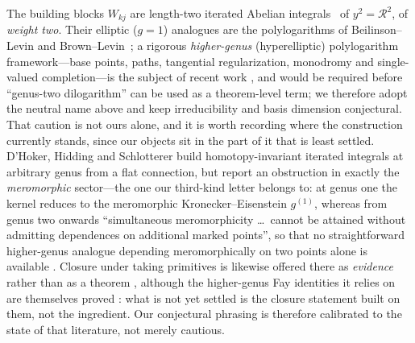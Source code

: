 \documentclass[12pt]{iopart}
\theoremstyle{plain}
\theoremstyle{definition}
\theoremstyle{remark}
\begin{document}
The building blocks $W_{kj}$ are length-two iterated Abelian
integrals~\cite{Chen1977} of $y^2=\mathcal{R}^2$, of \emph{weight two}. Their elliptic
($g{=}1$) analogues are the polylogarithms of Beilinson--Levin and
Brown--Levin~\cite{BeilinsonLevin1994,BrownLevin2011}; a rigorous \emph{higher-genus}
(hyperelliptic) polylogarithm framework---base points, paths, tangential
regularization, monodromy and single-valued completion---is the subject of recent work
\cite{BauneEtal2024,DHokerSchlotterer2024,DHokerHiddingSchlotterer2025,DHokerEnriquezSchlottererZerbini2026},
and would be required before ``genus-two
dilogarithm'' can be used as a theorem-level term; we therefore adopt the neutral name
above and keep irreducibility and basis dimension conjectural. That caution is not
ours alone, and it is worth recording where the construction currently stands,
since our objects sit in the part of it that is least settled. D'Hoker, Hidding and
Schlotterer build homotopy-invariant iterated integrals at arbitrary genus from a
flat connection, but report an obstruction in exactly the \emph{meromorphic}
sector---the one our third-kind letter belongs to: at genus one the kernel reduces
to the meromorphic Kronecker--Eisenstein $g^{(1)}$, whereas from genus two onwards
``simultaneous meromorphicity \dots\ cannot be attained without admitting
dependences on additional marked points'', so that no straightforward higher-genus
analogue depending meromorphically on two points alone is available
\cite[\S4.5]{DHokerHiddingSchlotterer2025}. Closure under taking primitives is
likewise offered there as \emph{evidence} rather than as a theorem
\cite[\S4.6]{DHokerHiddingSchlotterer2025}, although the higher-genus Fay
identities it relies on are themselves proved
\cite[\S5]{DHokerSchlotterer2024}: what is not yet settled is the closure
statement built on them, not the ingredient. Our conjectural phrasing is therefore
calibrated to the state of that literature, not merely cautious.
\end{document}
